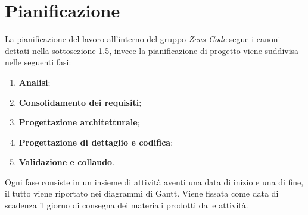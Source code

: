 \section{Pianificazione}
La pianificazione del lavoro all'interno del gruppo \textit{Zeus Code} segue i canoni dettati nella \hyperlink{scadenze}{sottosezione 1.5}, invece la pianificazione di progetto viene suddivisa nelle seguenti fasi:
\begin{enumerate}
	\item \textbf{Analisi};
	\item \textbf{Consolidamento dei requisiti};
	\item \textbf{Progettazione architetturale};
	\item \textbf{Progettazione di dettaglio e codifica};
	\item \textbf{Validazione e collaudo}.
\end{enumerate}
Ogni fase consiste in un insieme di attività aventi una data di inizio e una di fine, il tutto viene riportato nei diagrammi di Gantt\glo. Viene fissata come data di scadenza il giorno di consegna dei materiali prodotti dalle attività. 
